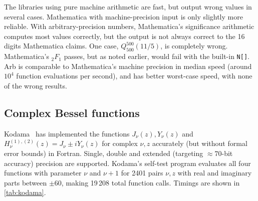 \documentclass[review,nohypdvips]{siamart0216}
\begin{document}
The libraries using pure machine arithmetic are fast, but
output wrong values in several cases.
Mathematica with machine-precision input is only slightly more reliable.
With arbitrary-precision numbers, Mathematica's significance arithmetic
computes most values correctly, but the output is not always correct
to the 16 digits Mathematica claims. One case,
$Q_{500}^{500}(11/5)$, is completely wrong.
Mathematica's ${}_2F_1$ passes,
but as noted earlier, would fail with the built-in \texttt{N[]}.
Arb is comparable to Mathematica's machine precision in
median speed (around $10^4$ function evaluations per second),
and has better worst-case speed,
with none of the wrong results.

\subsection{Complex Bessel functions}

Kodama~\cite{Kodama2011} has implemented the functions $J_{\nu}(z), Y_{\nu}(z)$ and
$H^{(1),(2)}_{\nu}(z) = J_{\nu} \pm i Y_{\nu}(z)$ for complex $\nu, z$
accurately (but without formal error bounds) in Fortran.
Single, double and extended (targeting $\approx 70$-bit accuracy) precision are supported.
Kodama's self-test program evaluates all four functions
with parameter $\nu$ and $\nu + 1$ for 2401 pairs $\nu,z$ with real
and imaginary parts between $\pm 60$, making
19\,208 total function calls. Timings are shown in \cref{tab:kodama}.
\end{document}
